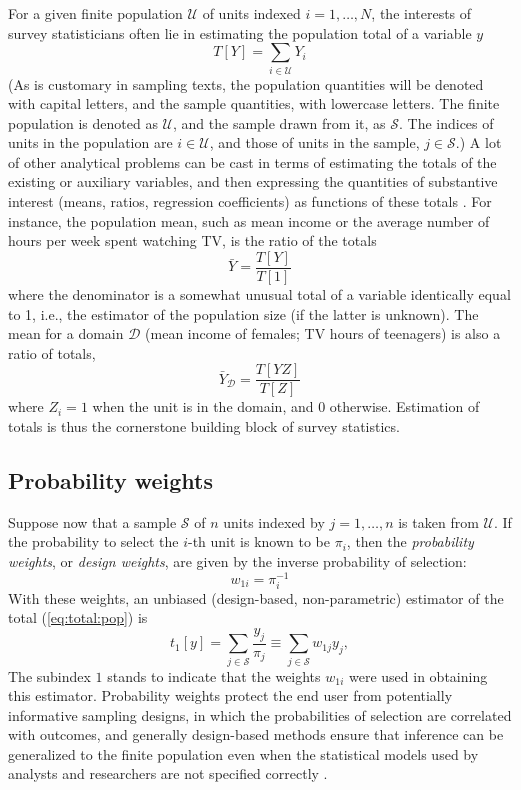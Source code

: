 For a given finite population $\mathcal U$ of units indexed $i=1,\ldots,N$,
the interests of survey statisticians often lie in estimating the
population total of a variable $y$
\begin{equation}
   T[Y] = \sum_{i \in \mathcal{U}} Y_i
   \label{eq:total:pop}
\end{equation}
(As is customary in sampling texts, the population quantities will be denoted
with capital letters, and the sample quantities, with lowercase letters.
The finite population is denoted as $\mathcal{U}$, and the sample drawn from it,
as $\mathcal{S}$. The indices of units in the population are $i\in \mathcal{U}$, and 
those of units in the sample, $j \in \mathcal{S}$.)
A lot of other analytical problems can be cast in terms of estimating
the totals of the existing or auxiliary variables, and then expressing
the quantities of substantive interest (means, ratios, regression
coefficients) as functions of these totals \citep{skinner:1989}.
For instance, the population mean,
such as mean income or
the average number of hours per week spent watching TV,
is the ratio of the totals
$$
    \bar Y = \frac{T[Y]}{T[1]}
$$
where the denominator is a somewhat unusual total of a variable
identically equal to 1, i.e., the estimator of the population size
(if the latter is unknown). The mean for a domain $\mathcal{D}$
(mean income of females; TV hours of teenagers) is also a ratio of totals,
$$
    \bar Y_\mathcal{D} = \frac{T[YZ]}{T[Z]}
$$
where $Z_i=1$ when the unit is in the domain, and 0 otherwise.
Estimation of totals is thus the cornerstone building block of survey
statistics.

\subsection{Probability weights}

Suppose now that a sample $\mathcal S$ of $n$ units indexed by $j=1,\ldots,n$
is taken from $\mathcal U$. If the probability to select the
$i$-th unit is known to be $\pi_i$, then
the {\it probability weights}, or {\it design weights}, are given by
the inverse probability of selection:
\begin{equation}
   w_{1i} = \pi_i^{-1}
   \label{eq:prob:weight}
\end{equation}
With these weights, an unbiased
(design-based, non-parametric) estimator
of the total (\ref{eq:total:pop}) is \citep{horvitz:thompson:1952}
\begin{equation}
   t_{1}[y] = \sum_{j \in \mathcal{S}} \frac{y_j}{\pi_j}
   \equiv \sum_{j \in \mathcal{S}} w_{1j} y_j
   \label{eq:total:sample},
\end{equation}
The subindex $1$ stands to indicate that the weights $w_{1i}$ were
used in obtaining this estimator. Probability weights protect
the end user from potentially informative sampling designs, in which
the probabilities of selection are correlated with outcomes,
and generally design-based methods ensure that inference can be generalized
to the finite population even when the statistical models used
by analysts and researchers are not specified correctly
\citep{pfeff:1993,binder:roberts:2003}.

